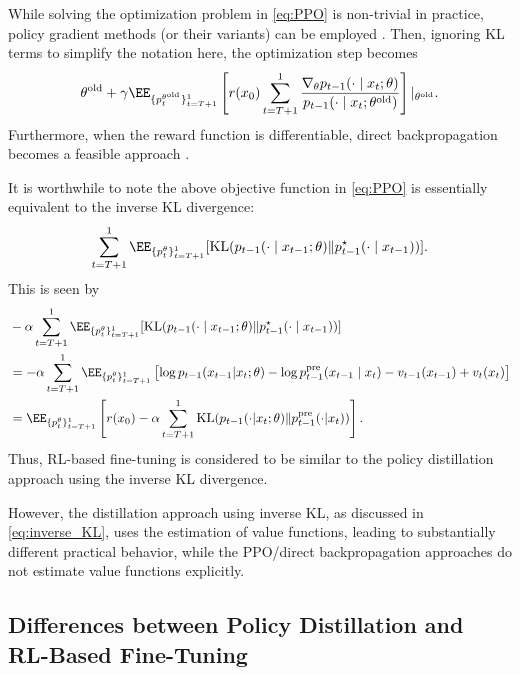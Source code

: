 While solving the optimization problem in \eqref{eq:PPO} is non-trivial in practice, policy gradient methods (or their variants) can be employed \citep{black2023training,fan2023dpok}. Then, ignoring KL terms to simplify the notation here, the optimization step becomes 
\begin{align}\label{eq:PPO2}
    \theta^{\mathrm{old}}  +  \gamma \EE_{\{p^{\theta^{\mathrm{old}}}_t\}_{t=T+1}^1} \left[r(x_0) \sum_{t=T+1}^1 \frac{\nabla_{\theta} p_{t-1}(\cdot \mid x_{t};\theta )}{p_{t-1}(\cdot \mid x_{t};\theta^{\mathrm{old}})}    \right]|_{\theta^{\mathrm{old}}}.
\end{align}
Furthermore, when the reward function is differentiable, direct backpropagation becomes a feasible approach \citep{clark2023directly,prabhudesai2023aligning}. 

It is worthwhile to note the above objective function in \eqref{eq:PPO} is essentially equivalent to the inverse KL divergence: 
\begin{align*}
   \sum_{t=T+1}^1  \EE_{\{p^{\theta}_t\}_{t=T+1}^1}[\mathrm{KL}(p_{t-1}(\cdot\mid x_{t-1};\theta)\|p^{\star}_{t-1}(\cdot\mid x_{t-1}))  ]. 
\end{align*}
This is seen by 
{\begin{align*}
    & - \alpha \sum_{t=T+1}^1 \EE_{\{p^{\theta}_t\}_{t=T+1}^1}[\mathrm{KL}(p_{t-1}(\cdot\mid x_{t-1};\theta)\|p^{\star}_{t-1}(\cdot\mid x_{t-1}))  ]\\
    &=- \alpha \sum_{t=T+1}^1 \EE_{\{p^{\theta}_t\}_{t=T+1}^1}\left [  \log p_{t-1}(x_{t-1}|x_t;\theta) -\log p^{\pre}_{t-1}(x_{t-1}\mid x_t) - v_{t-1}(x_{t-1}) + v_{t}(x_{t})  \right]  \\
        &= \EE_{\{p^{\theta}_t\}_{t=T+1}^1} \left[r(x_0) - \alpha \sum_{t=T+1}^1 \KL(p_{t-1}(\cdot|x_t;\theta) \| p^{\pre}_{t-1}(\cdot|x_t))   \right]. 
\end{align*} } 
Thus, RL-based fine-tuning is considered to be similar to the policy distillation approach using the inverse KL divergence. 

However, the distillation approach using inverse KL, as discussed in \eqref{eq:inverse_KL}, uses the estimation of value functions, leading to substantially different practical behavior, while the PPO/direct backpropagation approaches do not estimate value functions explicitly. 

\subsection{Differences between Policy Distillation and RL-Based Fine-Tuning}
\label{sec:compare_distill}

